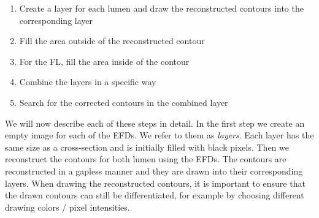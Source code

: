 \documentclass[thesis.tex]{subfiles}
\begin{document}
\begin{enumerate}
\item Create a layer for each lumen and draw the reconstructed contours into the corresponding layer
\item Fill the area outside of the reconstructed contour
\item For the FL, fill the area inside of the contour
\item Combine the layers in a specific way
\item Search for the corrected contours in the combined layer
\end{enumerate}

We will now describe each of these steps in detail. In the first step we create an empty image for each of the EFDs. We refer to them as \textit{layers}. Each layer has the same size as a cross-section and is initially filled with black pixels. Then we reconstruct the contours for both lumen using the EFDs. The contours are reconstructed in a gapless manner and they are drawn into their corresponding layers. When drawing the reconstructed contours, it is important to ensure that the drawn contours can still be differentiated, for example by choosing different drawing colors / pixel intensities. 
\end{document}
